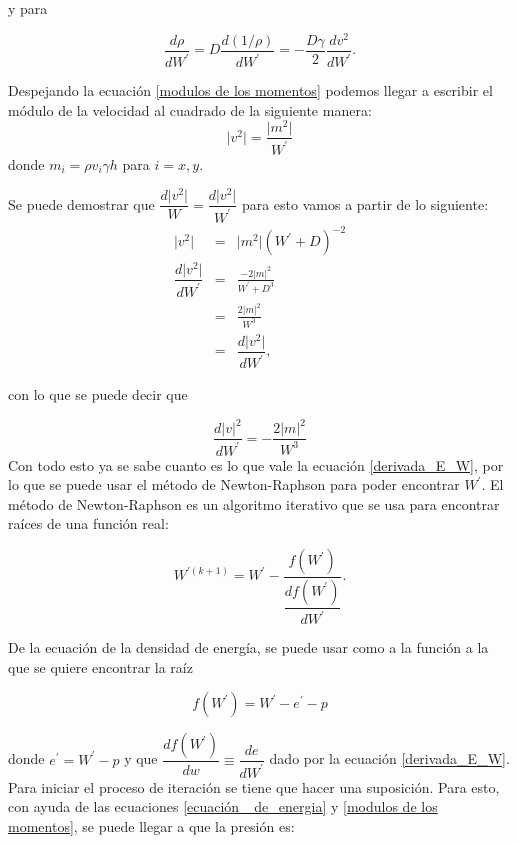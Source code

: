 \documentclass[12pt,a4paper]{book}
\providecommand{\abs}[1]{\lvert#1\rvert} %
\begin{document}
\noindent y para

\begin{equation}\label{der_rho}
\dfrac{d \rho}{d W^{'}}= D \dfrac{d\left(1/ \rho \right) }{d W^{'}} = - \frac{D \gamma}{2}  \dfrac{d v^2}{dW^{'}}.
\end{equation}

\noindent Despejando la ecuación \ref{modulos de los momentos} podemos llegar a escribir el módulo de la velocidad al cuadrado de la siguiente manera:
\begin{equation}
\abs{v^{2}} = \frac{\abs{m^{2}}}{W^{'}} 
\end{equation}
\noindent donde $m_i= \rho v_i \gamma h$ para $i=x,y$.

Se puede demostrar que $\dfrac{d \abs{v^2}}{W}=\dfrac{d \abs{v^2}}{W^{'}}$ para esto vamos a partir de lo siguiente: 
\begin{eqnarray*}
\abs{v^2}&=& \abs{m^{2}} \left(W^{'} + D \right)^{-2} \\
\dfrac{d \abs{v^2}}{d W^{'}} &=& \frac{-2 \abs{m}^2}{W^{'}+D^{3}} \\
&=& \frac{2 \abs{m}^2}{W^{3}} \\
&=& \dfrac{d \abs{v^2}}{d W^{'}},
\end{eqnarray*}

\noindent con lo que se puede decir que 

\begin{equation}\label{der_v2}
\dfrac{d\abs{v}^2}{d W^{'} }=-\frac{2 \abs{m}^{2}}{W^{3}}
\end{equation}
Con todo esto ya se sabe cuanto es lo que vale la ecuación \ref{derivada_E_W}, por lo que se puede usar el método de Newton-Raphson para poder encontrar $W^{'}$.
El método de Newton-Raphson es un algoritmo iterativo que se usa para encontrar raíces  de una función real:

\begin{equation} \label{eq_Newton_Raphson}
W^{'(k+1)}=W^{'}-\frac{f(W^{'})}{\dfrac{d f(W^{'})}{d W^{'}}}.
\end{equation}

De la ecuación de la densidad de energía, se puede usar como a la función a la que se quiere encontrar la raíz

\begin{equation} \label{ecuación_f}
f(W^{'})=W^{'}-e^{'}-p
\end{equation}

\noindent donde $e^{'}=W^{'}-p$ y que $\dfrac{d f(W^{'})}{d w} \equiv \dfrac{de}{dW^{'}}$ dado por la ecuación \ref{derivada_E_W}. 
Para iniciar el proceso de iteración se tiene que hacer una suposición. Para esto, con ayuda de las ecuaciones \ref{ecuación  _de_energia} 
y \ref{modulos de los momentos}, se puede llegar a que la presión es:
\end{document}
